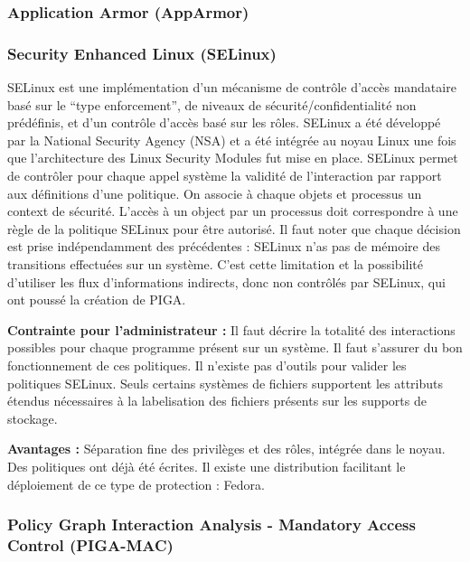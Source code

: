 \documentclass[pdftex,a4paper,titlepage,11pt]{article}
\begin{document}
\subsubsection{Application Armor (AppArmor)}

\subsubsection{Security Enhanced Linux (SELinux)}

SELinux est une implémentation d'un mécanisme de contrôle d'accès mandataire basé sur le ``type enforcement'', de niveaux de sécurité/confidentialité non prédéfinis, et d'un contrôle d'accès basé sur les rôles. SELinux a été développé par la National Security Agency (NSA) et a été intégrée au noyau Linux une fois que l'architecture des Linux Security Modules fut mise en place. SELinux permet de contrôler pour chaque appel système la validité de l'interaction par rapport aux définitions d'une politique. On associe à chaque objets et processus un context de sécurité. L'accès à un object par un processus doit correspondre à une règle de la politique SELinux pour être autorisé. Il faut noter que chaque décision est prise indépendamment des précédentes : SELinux n'as pas de mémoire des transitions effectuées sur un système. C'est cette limitation et la possibilité d'utiliser les flux d'informations indirects, donc non contrôlés par SELinux, qui ont poussé la création de PIGA.
\begin{list}{}{}
 \item \textbf{Contrainte pour l'administrateur :} Il faut décrire la totalité des interactions possibles pour chaque programme présent sur un système. Il faut s'assurer du bon fonctionnement de ces politiques. Il n'existe pas d'outils pour valider les politiques SELinux. Seuls certains systèmes de fichiers supportent les attributs étendus nécessaires à la labelisation des fichiers présents sur les supports de stockage.
 \item \textbf{Avantages :} Séparation fine des privilèges et des rôles, intégrée dans le noyau. Des politiques ont déjà été écrites. Il existe une distribution facilitant le déploiement de ce type de protection : Fedora.
\end{list}

\subsubsection{Policy Graph Interaction Analysis - Mandatory Access Control (PIGA-MAC)}
\end{document}
